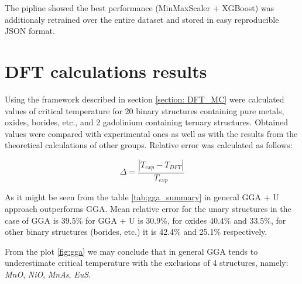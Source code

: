 The pipline showed the best performance (MinMaxScaler + XGBoost) was additionaly retrained over the entire dataset and stored in easy reproducible JSON format.



\section{DFT calculations results}
Using the framework described in section \ref{section: DFT_MC} were calculated values of critical temperature for 20 binary structures containing pure metals, oxides, borides, etc., and 2 gadolinium containing ternary structures.  Obtained values were compared with experimental ones as well as with the results from the theoretical calculations of other groups. Relative error was calculated as follows:

\begin{equation}
\Delta = \frac{\left| T_{exp} - T_{DFT} \right|}{T_{exp}}
\end{equation}

As it might be seen from the table \ref{tab:gga_summary} in general GGA + U approach outperforms GGA.  Mean relative error for the unary structures in the case of GGA is 39.5\% for GGA + U is 30.9\%, for oxides 40.4\% and 33.5\%,  for other binary structures (borides, etc.) it is 42.4\% and 25.1\% respectively. 

From the plot \ref{fig:gga} we may conclude that in general GGA tends to underestimate critical temperature with the exclusions of 4 structures, namely: \textit{MnO}, \textit{NiO}, \textit{MnAs}, \textit{EuS}. 

